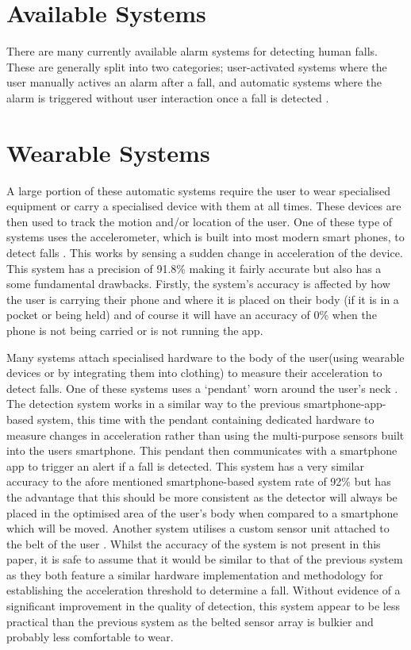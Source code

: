 \documentclass[11pt,a4paper]{report}
\begin{document}
\section{Available Systems}
There are many currently available alarm systems for detecting human falls. These are generally split into two categories; user-activated systems where the user manually actives an alarm after a fall, and automatic systems where the alarm is triggered without user interaction once a fall is detected \citep{Alwan_A_smart_and_passive_floor-vibration}. 

\section{Wearable Systems}
A large portion of these automatic systems require the user to wear specialised equipment or carry a specialised device with them at all times. These devices are then used to track the motion and/or location of the user. One of these type of systems uses the accelerometer, which is built into most modern smart phones, to detect falls \citep{Tsinganos_A_smartphone-based_fall}. This works by sensing a sudden change in acceleration of the device. This system has a precision of 91.8\% making it fairly accurate but also has a some fundamental drawbacks. Firstly, the system's accuracy is affected by how the user is carrying their phone and where it is placed on their body (if it is in a pocket or being held) and of course it will have an accuracy of  0\% when the phone is not being carried or is not running the app. 

Many systems attach specialised hardware to the body of the user(using wearable devices or by integrating them into clothing) to measure their acceleration to detect falls. One of these systems uses a `pendant' worn around the user's neck \citep{Santiago_Fall_detection_system}. The detection system works in a similar way to the previous smartphone-app-based system, this time with the pendant containing dedicated hardware to measure changes in acceleration rather than using the multi-purpose sensors built into the users smartphone. This pendant then communicates with a smartphone app to trigger an alert if a fall is detected. This system has a very similar accuracy to the afore mentioned smartphone-based system rate of 92\% but has the advantage that this should be more consistent as the detector will always be placed in the optimised area of the user's body when compared to a smartphone which will be moved. Another system utilises a custom sensor unit attached to the belt of the user \citep{Cruz_Fall_detection_wearable_device}. Whilst the accuracy of the system is not present in this paper, it is safe to assume that it would be similar to that of the previous system as they both feature a similar hardware implementation and methodology for establishing the acceleration threshold to determine a fall. Without evidence of a significant improvement in the quality of detection, this system appear to be less practical than the previous system as the belted sensor array is bulkier and probably less comfortable to wear. 
\end{document}
